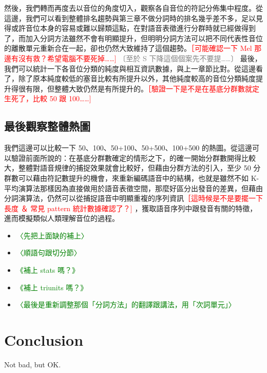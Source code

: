         然後，我們轉而再度去以音位的角度切入，觀察各自音位的符記分佈集中程度。從這邊，我們可以看到整體排名趨勢與第三章不做分詞時的排名幾乎差不多，足以見得或許音位本身的容易或難以歸類這點，在對語音表徵進行分群時就已經做得到了，而加入分詞方法雖然不會有明顯提升，但明明分詞方法可以把不同代表性音位的離散單元重新合在一起，卻也仍然大致維持了這個趨勢。\textcolor{red}{［可能確認一下 Mel 那邊有沒有救？希望電腦不要死掉……] }\textcolor{gray}{〔至於 S 下降這個個案先不要提……〕 }
        最後，我們可以統計一下各音位分類的純度與相互資訊數據，與上一章節比對。從這邊看了，除了原本純度較低的塞音比較有所提升以外，其他純度較高的音位分類純度提升得很有限，但整體大致仍然是有所提升的。\textcolor{red}{［驗證一下是不是在基底分群數就定生死了，比較 50 跟 100……] }

\subsection{最後觀察整體熱圖}

        我們這邊可以比較一下 50、100、50+100、50+500、100+500 的熱圖。從這邊可以驗證前面所說的：在基底分群數確定的情形之下，的確一開始分群數開得比較大，整體對語音規律的捕捉效果就會比較好，但藉由分群方法的引入，至少 50 分群數可以藉由符記數提升的機會，來重新編碼語音中的結構，也就是雖然不如 K-平均演算法那樣因為直接做用於語音表徵空間，那麼好區分出發音的差異，但藉由分詞演算法，仍然可以從捕捉語音中明顯重複的序列資訊\textcolor{red}{［這時候是不是要擺一下長度 ＆ 常見 pattern 統計數據確認了？] } ，獲取語音序列中跟發音有關的特徵，進而模擬類似人類理解音位的過程。

\begin{itemize}
    \item \textcolor{green}{〈先把上面缺的補上〉 }
    \item \textcolor{green}{〈順語句跟切分節〉 }
    \item \textcolor{green}{《補上 stats 嗎？》 }
    \item \textcolor{green}{《補上 triunits 嗎？》 }
    \item \textcolor{green}{〈最後是重新調整那個「分詞方法」的翻譯跟講法，用「次詞單元」〉 }
\end{itemize}

\section{Conclusion}

        Not bad, but OK.

